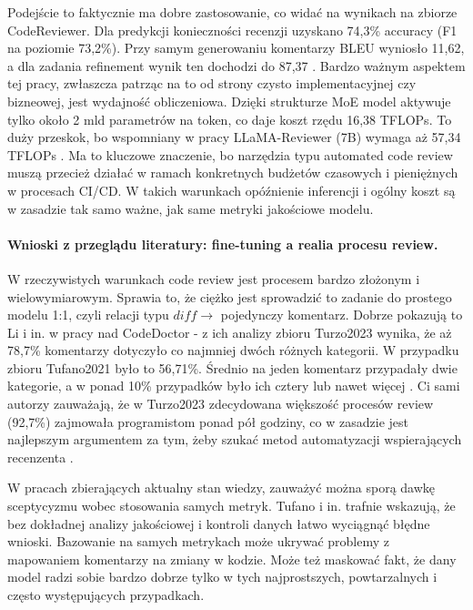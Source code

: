 Podejście to faktycznie ma dobre zastosowanie, co widać na wynikach na zbiorze CodeReviewer. Dla predykcji konieczności recenzji uzyskano 74,3\% accuracy (F1 na poziomie 
73,2\%). Przy samym generowaniu komentarzy BLEU wyniosło 11,62, a dla zadania refinement 
wynik ten dochodzi do 87,37 \cite{Tang2025MoEReviewer}. Bardzo ważnym aspektem tej pracy, zwłaszcza 
patrząc na to od strony czysto implementacyjnej czy bizneowej, jest wydajność obliczeniowa. Dzięki strukturze 
MoE model aktywuje tylko około 2 mld parametrów na token, co daje 
koszt rzędu 16,38 TFLOPs. To duży przeskok, bo wspomniany w pracy LLaMA-Reviewer 
(7B) wymaga aż 57,34 TFLOPs \cite{Tang2025MoEReviewer}. Ma to kluczowe znaczenie, bo narzędzia 
typu automated code review muszą przecież działać w ramach konkretnych budżetów czasowych i pieniężnych w procesach 
CI/CD. W takich warunkach opóźnienie inferencji i ogólny koszt są w zasadzie 
tak samo ważne, jak same metryki jakościowe modelu.

\paragraph{Wnioski z przeglądu literatury: fine-tuning a realia procesu review.}
W rzeczywistych warunkach code review jest procesem bardzo złożonym i wielowymiarowym. Sprawia to, że
ciężko jest sprowadzić to zadanie do prostego modelu 1:1, czyli relacji typu $diff \rightarrow$ pojedynczy komentarz.
Dobrze pokazują to Li i in. w pracy nad CodeDoctor - z ich analizy zbioru Turzo2023 wynika, że aż 78,7\% 
komentarzy dotyczyło co najmniej dwóch różnych kategorii. W przypadku zbioru Tufano2021 było 
to 56,71\%. Średnio na jeden komentarz przypadały dwie kategorie, a w ponad 
10\% przypadków było ich cztery lub nawet więcej \cite{Li2025CodeDoctor}. Ci sami autorzy 
zauważają, że w Turzo2023 zdecydowana większość procesów review (92,7\%) zajmowała programistom ponad 
pół godziny, co w zasadzie jest najlepszym argumentem za tym, żeby szukać 
metod automatyzacji wspierających recenzenta \cite{Li2025CodeDoctor}.

W pracach zbierających aktualny stan wiedzy, zauważyć można sporą dawkę sceptycyzmu wobec stosowania samych metryk.
Tufano i in. \cite{Tufano2024CodeReviewAutomation} trafnie wskazują, 
że bez dokładnej analizy jakościowej i kontroli danych łatwo wyciągnąć błędne wnioski. Bazowanie na samych metrykach
może ukrywać problemy z mapowaniem komentarzy na zmiany w kodzie. Może też maskować fakt, że dany model radzi sobie
bardzo dobrze tylko w tych najprostszych, powtarzalnych i często występujących przypadkach.


